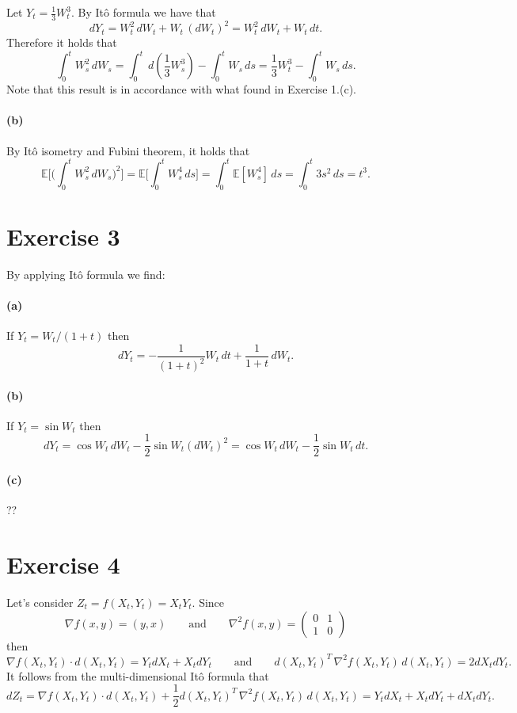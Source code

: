 \documentclass[a4paper,11pt]{article}
\theoremstyle{definition}
\theoremstyle{plain}
\theoremstyle{remark}
\begin{document}
Let $Y_t = \frac{1}{3}W_t^3$. By It\^o formula we have that
$$
dY_t = W_t^2\,dW_t + W_t\,(dW_t)^2 = W_t^2\,dW_t + W_t\,dt.
$$
Therefore it holds that
$$
\int_0^t W_s^2\,dW_s = \int_0^t\,d(\frac{1}{3}W_s^3) - \int_0^tW_s\,ds = \frac{1}{3}W_t^3 - \int_0^tW_s\,ds.
$$
Note that this result is in accordance with what found in Exercise 1.(c).

\paragraph*{(b)} 

By It\^o isometry and Fubini theorem, it holds that
$$
\mathbb{E}\Big[\Big(\int_0^t W_s^2\,dW_s\Big)^2\Big] = \mathbb{E}\Big[\int_0^tW_s^4\,ds\Big] = \int_0^t\mathbb{E}[W_s^4]\,ds = \int_0^t 3s^2\,ds = t^3. 
$$

\section*{Exercise 3}

By applying It\^o formula we find:

\paragraph*{(a)}

If $Y_t = W_t/(1+t)$ then
$$
dY_t = -\frac{1}{(1+t)^2}W_t\,dt + \frac{1}{1+t}\,dW_t.
$$

\paragraph*{(b)}

If $Y_t = \sin W_t$ then
$$
dY_t = \cos W_t\,dW_t-\frac{1}{2}\sin W_t (dW_t)^2 = \cos W_t\,dW_t-\frac{1}{2}\sin W_t\,dt.
$$

\paragraph*{(c)}

??

\section*{Exercise 4}

Let's consider $Z_t=f(X_t,Y_t) = X_tY_t$. Since 
$$
\nabla f(x,y) = (y,x) \qquad\text{and}\qquad \nabla^2f(x,y) = \left(\begin{matrix}
0 & 1 \\ 1 & 0
\end{matrix}\right) 
$$
then 
$$
\nabla f(X_t,Y_t) \cdot d(X_t,Y_t) = Y_tdX_t + X_tdY_t \qquad\text{and}\qquad d(X_t,Y_t)^T\,\nabla^2f(X_t,Y_t)\,d(X_t,Y_t) = 2dX_tdY_t. 
$$
It follows from the multi-dimensional It\^o formula that
$$
dZ_t = \nabla f(X_t,Y_t) \cdot d(X_t,Y_t) + \frac{1}{2}d(X_t,Y_t)^T\,\nabla^2f(X_t,Y_t)\,d(X_t,Y_t) = Y_tdX_t + X_tdY_t + dX_tdY_t.
$$
\end{document}
